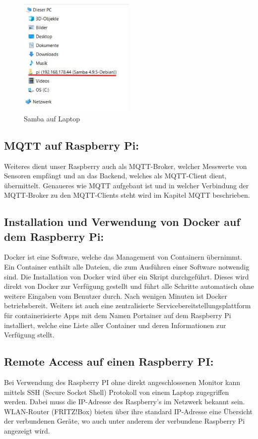 \begin{figure}[H]
    \centering
    \includegraphics[width=0.5\textwidth]{pics/RaspberrySamba.JPG}
    \caption{Samba auf Laptop}
\end{figure}



\subsection {MQTT auf Raspberry Pi:}
Weiteres dient unser Raspberry auch als MQTT-Broker, welcher Messwerte von Sensoren empfängt und an das Backend, welches als MQTT-Client dient, übermittelt. 
Genaueres wie MQTT aufgebaut ist und in welcher Verbindung der MQTT-Broker zu den MQTT-Clients steht wird im Kapitel MQTT beschrieben.

\subsection {Installation und Verwendung von Docker auf dem Raspberry Pi:}

Docker ist eine Software, welche das Management von Containern übernimmt. Ein Container enthält alle Dateien, die zum Ausführen einer Software notwendig sind. 
Die Installation von Docker wird über ein Skript durchgeführt. 
Dieses wird direkt von Docker zur Verfügung gestellt und führt alle Schritte automatisch ohne weitere Eingaben vom Benutzer durch. 
Nach wenigen Minuten ist Docker betriebsbereit. 
Weiters ist auch eine zentralisierte Servicebereitstellungsplattform für containerisierte Apps 
mit dem Namen Portainer auf dem Raspberry Pi installiert, 
welche eine Liste aller Container und deren Informationen zur Verfügung stellt.
 


\subsection {Remote Access auf einen Raspberry PI:}
Bei Verwendung des Raspberry PI ohne direkt angeschlossenen Monitor kann mittels SSH (Secure Socket Shell) Protokoll von einem Laptop zugegriffen werden.
Dabei muss die IP-Adresse des Raspberry's im Netzwerk bekannt sein. WLAN-Router (FRITZ!Box) bieten über ihre standard IP-Adresse eine Übersicht der verbundenen Geräte, wo auch unter anderem der verbundene Raspberry Pi angezeigt wird. 

